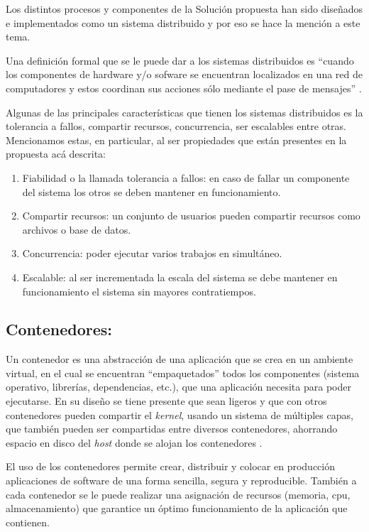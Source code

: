 \documentclass[
  12pt,
  openany]{book}
\begin{document}
Los distintos procesos y componentes de la Solución propuesta han sido diseñados e implementados como un sistema distribuido y por eso se hace la mención a este tema.

Una definición formal que se le puede dar a los sistemas distribuidos es ``cuando los componentes de hardware y/o sofware se encuentran localizados en una red de computadores y estos coordinan sus acciones sólo mediante el pase de mensajes'' \citep{distribu2012}.

Algunas de las principales características que tienen los sistemas distribuidos es la tolerancia a fallos, compartir recursos, concurrencia, ser escalables \citep{czaja2018} entre otras. Mencionamos estas, en particular, al ser propiedades que están presentes en la propuesta acá descrita:

\begin{enumerate}
\def\labelenumi{\arabic{enumi}.}
\item
  Fiabilidad o la llamada tolerancia a fallos: en caso de fallar un componente del sistema los otros se deben mantener en funcionamiento.
\item
  Compartir recursos: un conjunto de usuarios pueden compartir recursos como archivos o base de datos.
\item
  Concurrencia: poder ejecutar varios trabajos en simultáneo.
\item
  Escalable: al ser incrementada la escala del sistema se debe mantener en funcionamiento el sistema sin mayores contratiempos.
\end{enumerate}

\hypertarget{contenedores}{%
\subsection{Contenedores:}\label{contenedores}}

Un contenedor es una abstracción de una aplicación que se crea en un ambiente virtual, en el cual se encuentran ``empaquetados'' todos los componentes (sistema operativo, librerías, dependencias, etc.), que una aplicación necesita para poder ejecutarse. En su diseño se tiene presente que sean ligeros y que con otros contenedores pueden compartir el \emph{kernel}, usando un sistema de múltiples capas, que también pueden ser compartidas entre diversos contenedores, ahorrando espacio en disco del \emph{host} donde se alojan los contenedores \citep{nüst2020}.

El uso de los contenedores permite crear, distribuir y colocar en producción aplicaciones de software de una forma sencilla, segura y reproducible. También a cada contenedor se le puede realizar una asignación de recursos (memoria, cpu, almacenamiento) que garantice un óptimo funcionamiento de la aplicación que contienen.
\end{document}
